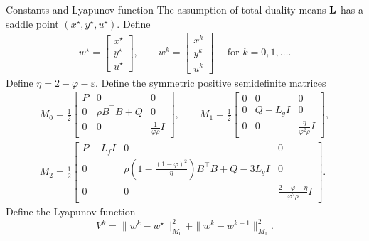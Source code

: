 \documentclass[10pt,mathserif]{beamer}
\begin{document}
\begin{frame}{Constants and Lyapunov function}
The assumption of total duality means $\mathbf{L}$ has a saddle point $(x^\star,y^\star,u^\star)$. Define
  \begin{align*}
    w^\star = \begin{bmatrix}
            x^\star\\
            y^\star\\
            u^\star
          \end{bmatrix}
    ,\qquad
    w^k = \begin{bmatrix}
            x^k\\
            y^k\\
            u^k
          \end{bmatrix}
          \quad\text{ for }k=0,1,\dots.
  \end{align*}
  Define $\eta=2-\varphi-\varepsilon$.
  Define the symmetric positive semidefinite matrices
  \begin{gather*}
      M_0 = \frac{1}{2}
        \begin{bmatrix}
          P & 0 & 0\\
          0 & \rho B^\intercal  B + Q & 0\\
          0 & 0 & \frac{1}{\varphi\rho} I
        \end{bmatrix},\qquad
  M_1 = \frac{1}{2}
      \begin{bmatrix}
        0 & 0 & 0 \\
        0 & Q + L_g I  & 0 \\
        0 & 0 & \frac{\eta}{\varphi^2\rho}I
      \end{bmatrix},
    \\
  M_2 = \frac{1}{2}
      \begin{bmatrix}
        P-L_f I & 0 & 0 \\
        0 & \rho\left(1-\frac{(1-\varphi)^2}{\eta}\right) B^\intercal  B + Q - 3L_g I& 0 \\
        0 & 0 & \frac{2-\varphi -\eta}{\varphi^2\rho}I
      \end{bmatrix}.
  \end{gather*}
Define the Lyapunov function
\[
V^k= \|w^k-w^\star\|_{M_0}^2 + \|w^{k}-w^{k-1}\|_{M_1}^2.
\]
\end{frame}
\end{document}
